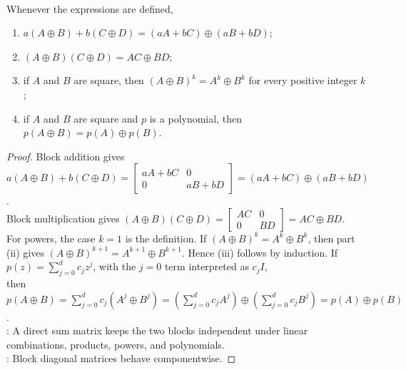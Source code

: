 \begin{proposition} \label{prop:direct-sum-matrix-algebra} \\
Whenever the expressions are defined,
\begin{enumerate}[label=(\roman*)]
\setlength{\itemsep}{0pt}
\item $a(A\oplus B)+b(C\oplus D)=(aA+bC)\oplus(aB+bD)$;
\item $(A\oplus B)(C\oplus D)=AC\oplus BD$;
\item if $A$ and $B$ are square, then $(A\oplus B)^k=A^k\oplus B^k$ for every positive integer $k$;
\item if $A$ and $B$ are square and $p$ is a polynomial, then $p(A\oplus B)=p(A)\oplus p(B)$.
\end{enumerate}
\begin{proof}
Block addition gives $a(A\oplus B)+b(C\oplus D)
=
\begin{bmatrix}
aA+bC&0\\
0&aB+bD
\end{bmatrix}
=(aA+bC)\oplus(aB+bD)$.\\
Block multiplication gives $(A\oplus B)(C\oplus D)
=
\begin{bmatrix}
AC&0\\
0&BD
\end{bmatrix}
=AC\oplus BD$.\\
For powers, the case $k=1$ is the definition. If $(A\oplus B)^k=A^k\oplus B^k$, then part (ii) gives $(A\oplus B)^{k+1}=A^{k+1}\oplus B^{k+1}$. Hence (iii) follows by induction. If $p(z)=\sum_{j=0}^{d}c_jz^j$, with the $j=0$ term interpreted as $c_jI$,\\
then $p(A\oplus B)=\sum\limits_{j=0}^{d}c_j(A^j\oplus B^j) =\left(\sum\limits_{j=0}^{d}c_jA^j\right)\oplus\left(\sum\limits_{j=0}^{d}c_jB^j\right) =p(A)\oplus p(B)$.\\
: A direct sum matrix keeps the two blocks independent under linear combinations, products, powers, and polynomials.\\
: Block diagonal matrices behave componentwise.
\end{proof}
\end{proposition}


